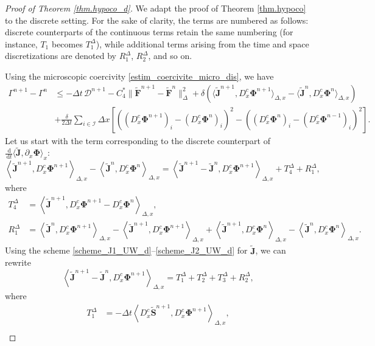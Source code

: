 \documentclass[reqno]{amsart}
\newcommand{\Dx}{\Delta x}
\newcommand{\dd}{\,\mathrm{d}}
\newcommand{\II}{\mathcal{I}}
\newcommand{\Ft}{{\widetilde{F}}}
\newcommand{\Jt}{\widetilde{J}}
\newcommand{\St}{\widetilde{S}}
\newcommand{\Ftbf}{\mathbf{\Ft}}
\newcommand{\Phibf}{\boldsymbol{\Phi}}
\newcommand{\Jtbf}{\mathbf{\Jt}}
\newcommand{\Stbf}{\mathbf{\St}}
\newcommand{\lla}{\left\langle}
\newcommand{\rra}{\right\rangle}
\numberwithin{equation}{section}
\begin{document}
\begin{proof}[Proof of Theorem \ref{thm.hypoco_d}]
    We adapt the proof of Theorem \ref{thm.hypoco} to the discrete setting. For the sake of clarity, the terms are numbered as follows: discrete counterparts of the continuous terms retain the same numbering (for instance, $T_1$ becomes $T_1^\Delta$), while additional terms arising from the time and space discretizations are denoted by $R_1^\Delta$, $R_2^\Delta$, and so on.
    
    Using the microscopic coercivity \eqref{estim_coercivite_micro_dis}, we have
    \begin{align}
        \Gamma^{n+1}-\Gamma^n &\leq  -  \Delta t\,\mathcal{D}^{n+1}-C_{4}^*\|\Ftbf^{n+1}-\Ftbf^n\|_{\Delta}^2 + \delta\left(\langle \Jtbf^{n+1},D_x^c\Phibf^{n+1}\rangle_{\Delta,x}-\langle \Jtbf^{n},D_x^c\Phibf^{n}\rangle_{\Delta,x}\right)\nonumber\\
        &+\frac{\delta}{2\Delta t}\sum_{i\in\II}\Dx \left[\left((D_x^c\Phibf^{n+1})_i-(D_x^c\Phibf^{n})_i\right)^2- \left((D_x^c\Phibf^n)_i-(D_x^c\Phibf^{n-1})_i\right)^2\right].\label{hypoco_d.1}
    \end{align}
    Let us start with the term corresponding to the discrete counterpart of $\frac{\dd}{\dd t}\langle \Jtbf,\partial_x\Phibf\rangle_x$: 
    \begin{equation*}
        \lla \Jtbf^{n+1},D_x^c\Phibf^{n+1}\rra_{\Delta,x}-\lla \Jtbf^n,D_x^c\Phibf^n \rra_{\Delta,x}=\lla \Jtbf^{n+1}-\Jtbf^n,D_x^c\Phibf^{n+1}\rra_{\Delta,x}+T_4^\Delta+R_1^\Delta,
    \end{equation*}
    where 
    \begin{align*}
        T_4^\Delta&=\lla \Jtbf^{n+1},D_x^c\Phibf^{n+1}-D_x^c\Phibf^{n}\rra_{\Delta,x},\\
        R_1^\Delta&=\lla \Jtbf^n,D_x^c\Phibf^{n+1}\rra_{\Delta,x}-\lla \Jtbf^{n+1},D_x^c\Phibf^{n+1}\rra_{\Delta,x}+\lla \Jtbf^{n+1},D_x^c\Phibf^{n}\rra_{\Delta,x}-\lla \Jtbf^n,D_x^c\Phibf^{n}\rra_{\Delta,x}. 
    \end{align*}
    Using the scheme \eqref{scheme_J1_UW_d}--\eqref{scheme_J2_UW_d} for $\Jtbf$, we can rewrite
    \begin{equation*}
        \lla \Jtbf^{n+1}-\Jtbf^n,D_x^c\Phibf^{n+1}\rra_{\Delta,x}=T_1^\Delta+T_2^\Delta+T_3^\Delta+R_2^\Delta,
    \end{equation*}
    where
   \begin{align*}
        T_{1}^\Delta&= -\Delta t \lla D_x^c \Stbf^{n+1},D_x^c\Phibf^{n+1}\rra_{\Delta,x},\\

\end{align*}
\end{proof}
\end{document}
